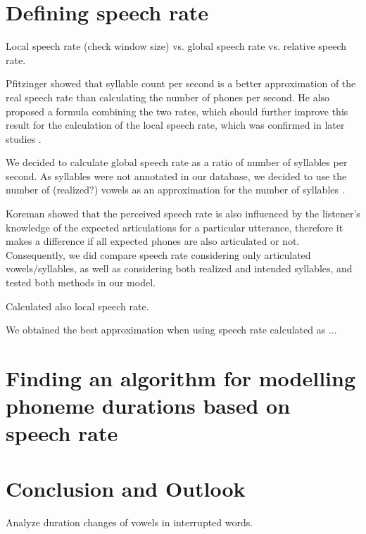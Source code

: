 \documentclass[a4paper]{scrreprt}
\begin{document}
\chapter{Defining speech rate}

Local speech rate (check window size) vs. global speech rate vs. relative speech rate.

Pfitzinger \cite{Pfitzinger1998} showed that syllable count per second is a better approximation of the real speech rate than calculating the number of phones per second. He also proposed a formula combining the two rates, which should further improve this result for the calculation of the local speech rate, which was confirmed in later studies \cite{Pfitzinger1999}.

We decided to calculate global speech rate as a ratio of number of syllables per second. As syllables were not annotated in our database, we decided to use the number of (realized?) vowels as an approximation for the number of syllables \cite{Yishan_Jiao_2015} \cite{Kohler1995}.

Koreman showed \cite{Koreman_2006} that the perceived speech rate is also influenced by the listener's knowledge of the expected articulations for a particular utterance, therefore it makes a difference if all expected phones are also articulated or not. Consequently, we did compare speech rate considering only articulated vowels/syllables, as well as considering both realized and intended syllables,  and tested both methods in our model.

Calculated also local speech rate.

We obtained the best approximation when using speech rate calculated as ...

\chapter{Finding an algorithm for modelling phoneme durations based on speech rate}

\chapter{Conclusion and Outlook}
Analyze duration changes of vowels in interrupted words.

\printbibliography
\end{document}
